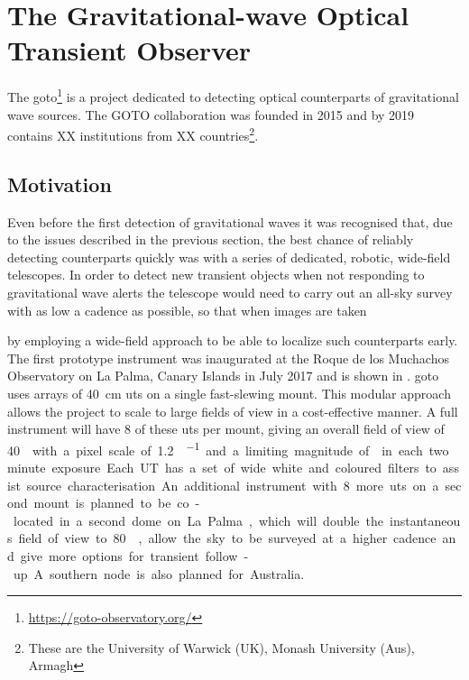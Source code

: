 \section{The Gravitational-wave Optical Transient Observer}
\label{sec:goto}
\begin{colsection}


\begin{colsection}

The \gls{goto}\footnote{\url{https://goto-observatory.org/}} is a project dedicated to detecting optical counterparts of gravitational wave sources. The GOTO collaboration was founded in 2015 and by 2019 contains XX institutions from XX countries\footnote{These are the University of Warwick (UK), Monash University (Aus), Armagh }.


\subsection{Motivation}
\label{sec:goto_motivation}
\begin{colsection}

Even before the first detection of gravitational waves it was recognised that, due to the issues described in the previous section, the best chance of reliably detecting counterparts quickly was with a series of dedicated, robotic, wide-field telescopes. In order to detect new transient objects when not responding to gravitational wave alerts the telescope would need to carry out an all-sky survey with as low a cadence as possible, so that when images are taken

\end{colsection}


by employing a wide-field approach to be able to localize such counterparts early. The first prototype instrument was inaugurated at the Roque de los Muchachos Observatory on La Palma, Canary Islands in July 2017 and is shown in . \gls{goto} uses arrays of \SI{40}{\cm} \glspl{ut} on a single fast-slewing mount. This modular approach allows the project to scale to large fields of view in a cost-effective manner. A full instrument will have 8 of these \glspl{ut} per mount, giving an overall field of view of \SI{40}{\square\deg} with a pixel scale of \SI[per-mode=symbol]{1.2}{\arcsec\per\pixel} and a limiting magnitude of  in each two minute exposure. Each UT has a set of wide white and coloured filters to assist source characterisation.  An additional instrument with 8 more \glspl{ut} on a second mount is planned to be co-located in a second dome on La Palma, which will double the instantaneous field of view to \SI{80}{\square\deg}, allow the sky to be surveyed at a higher cadence and give more options for transient follow-up. A southern node is also planned for Australia.


\end{colsection}
\end{colsection}
